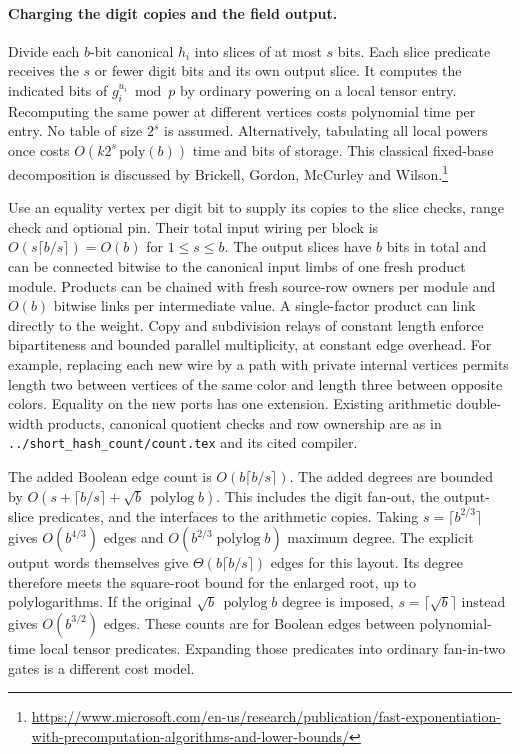 \documentclass[11pt]{article}
\newcommand{\polylog}{\operatorname{polylog}}
\begin{document}
\paragraph{Charging the digit copies and the field output.}
Divide each $b$-bit canonical $h_i$ into slices of at most $s$ bits.
Each slice predicate receives the $s$ or fewer digit bits and its own
output slice. It computes the indicated bits of $g_i^{u_i}\bmod p$
by ordinary powering on a local tensor entry. Recomputing the same
power at different vertices costs polynomial time per entry. No table
of size $2^s$ is assumed. Alternatively, tabulating all local powers
once costs $O(k2^s\,\mathrm{poly}(b))$ time and bits of storage. This
classical fixed-base decomposition is discussed by Brickell, Gordon,
McCurley and Wilson.\footnote{\url{https://www.microsoft.com/en-us/research/publication/fast-exponentiation-with-precomputation-algorithms-and-lower-bounds/}}

Use an equality vertex per digit bit to supply its copies to the slice
checks, range check and optional pin. Their total input wiring per
block is $O(s\lceil b/s\rceil)=O(b)$ for $1\le s\le b$.
The output slices have $b$ bits in total and can be connected bitwise
to the canonical input limbs of one fresh product module. Products
can be chained with fresh source-row owners per module and $O(b)$
bitwise links per intermediate value. A single-factor product can
link directly to the weight. Copy and subdivision relays of constant
length enforce bipartiteness and bounded parallel multiplicity, at
constant edge overhead. For example, replacing each new wire by a path
with private internal vertices permits length two between vertices of
the same color and length three between opposite colors. Equality on
the new ports has one extension. Existing arithmetic double-width
products, canonical quotient checks and row ownership are as in
\texttt{../short\_hash\_count/count.tex} and its cited compiler.

The added Boolean edge count is $O(b\lceil b/s\rceil)$.
The added degrees are bounded by
$O(s+\lceil b/s\rceil+\sqrt b\,\polylog b)$. This includes the
digit fan-out, the output-slice predicates, and the interfaces to the
arithmetic copies. Taking $s=\lceil b^{2/3}\rceil$ gives
$O(b^{4/3})$ edges and $O(b^{2/3}\polylog b)$ maximum degree.
The explicit output words themselves give $\Theta(b\lceil b/s\rceil)$
edges for this layout. Its degree therefore meets the square-root
bound for the enlarged root, up to polylogarithms. If the original
$\sqrt b\,\polylog b$ degree is imposed, $s=\lceil\sqrt b\rceil$
instead gives $O(b^{3/2})$ edges. These counts are for Boolean
edges between polynomial-time local tensor predicates. Expanding those
predicates into ordinary fan-in-two gates is a different cost model.
\end{document}
